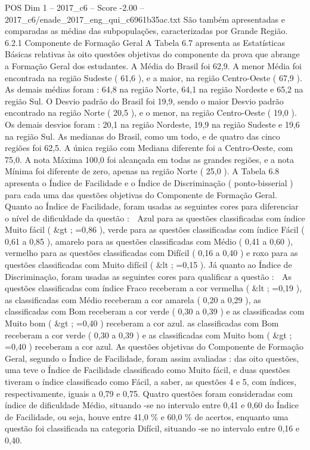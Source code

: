\begin{textsample}{POS Dim 1 – 2017\_c6 – Score -2.00 – 2017\_c6/enade\_2017\_eng\_qui\_c6961b35ac.txt}
São também apresentadas e comparadas as médias das subpopulações, caracterizadas por Grande Região. 6.2.1 Componente de Formação Geral A Tabela 6.7 apresenta as Estatísticas Básicas relativas às oito questões objetivas do componente da prova que abrange a Formação Geral dos estudantes.
A Média do Brasil foi 62,9.
A menor Média foi encontrada na região Sudeste ( 61,6 ), e a maior, na região Centro-Oeste ( 67,9 ).
As demais médias foram : 64,8 na região Norte, 64,1 na região Nordeste e 65,2 na região Sul.
O Desvio padrão do Brasil foi 19,9, sendo o maior Desvio padrão encontrado na região Norte ( 20,5 ), e o menor, na região Centro-Oeste ( 19,0 ).
Os demais desvios foram : 20,1 na região Nordeste, 19,9 na região Sudeste e 19,6 na região Sul.
As medianas do Brasil, como um todo, e de quatro das cinco regiões foi 62,5.
A única região com Mediana diferente foi a Centro-Oeste, com 75,0.
A nota Máxima 100,0 foi alcançada em todas as grandes regiões, e a nota Mínima foi diferente de zero, apenas na região Norte ( 25,0 ).
A Tabela 6.8 apresenta o Índice de Facilidade e o Índice de Discriminação ( ponto-bisserial ) para cada uma das questões objetivas do Componente de Formação Geral.
Quanto ao Índice de Facilidade, foram usadas as seguintes cores para diferenciar o nível de dificuldade da questão :  Azul para as questões classificadas com índice Muito fácil ( \&gt ; =0,86 ), verde para as questões classificadas com índice Fácil ( 0,61 a 0,85 ), amarelo para as questões classificadas com Médio ( 0,41 a 0,60 ), vermelho para as questões classificadas com Difícil ( 0,16 a 0,40 ) e roxo para as questões classificadas com Muito difícil ( \&lt ; =0,15 ).
Já quanto ao Índice de Discriminação, foram usadas as seguintes cores para qualificar a questão :  As questões classificadas com índice Fraco receberam a cor vermelha ( \&lt ; =0,19 ), as classificadas com Médio receberam a cor amarela ( 0,20 a 0,29 ), as classificadas com Bom receberam a cor verde ( 0,30 a 0,39 ) e as classificadas com Muito bom ( \&gt ; =0,40 ) receberam a cor azul. as classificadas com Bom receberam a cor verde ( 0,30 a 0,39 ) e as classificadas com Muito bom ( \&gt ; =0,40 ) receberam a cor azul.
As questões objetivas do Componente de Formação Geral, segundo o Índice de Facilidade, foram assim avaliadas : das oito questões, uma teve o Índice de Facilidade classificado como Muito fácil, e duas questões tiveram o índice classificado como Fácil, a saber, as questões 4 e 5, com índices, respectivamente, iguais a 0,79 e 0,75.
Quatro questões foram consideradas com índice de dificuldade Médio, situando -se no intervalo entre 0,41 e 0,60 do Índice de Facilidade, ou seja, houve entre 41,0 \% e 60,0 \% de acertos, enquanto uma questão foi classificada na categoria Difícil, situando -se no intervalo entre 0,16 e 0,40.

\end{textsample}
